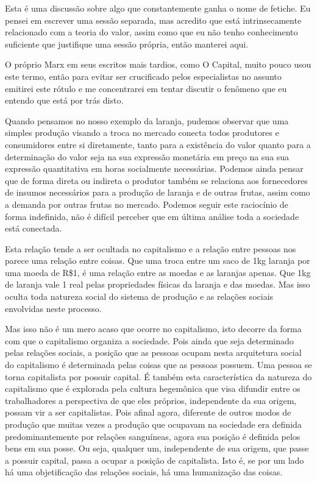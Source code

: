 Esta é uma discussão sobre algo que constantemente ganha o nome de fetiche. Eu pensei em escrever uma sessão separada, mas acredito que está intrinsecamente relacionado com a teoria do valor, assim como que eu não tenho conhecimento suficiente que justifique uma sessão própria, então manterei aqui.

O próprio Marx em seus escritos mais tardios, como O Capital, muito pouco usou este termo, então para evitar ser crucificado pelos especialistas no assunto emitirei este rótulo e me concentrarei em tentar discutir o fenômeno que eu entendo que está por trás disto. 

Quando pensamos no nosso exemplo da laranja, pudemos observar que uma simples produção visando a troca no mercado conecta todos produtores e consumidores entre si diretamente, tanto para a existência do valor quanto para a determinação do valor seja na sua expressão monetária em preço na sua sua expressão quantitativa em horas socialmente necessárias. Podemos ainda pensar que de forma direta ou indireta o produtor também se relaciona aos fornecedores de insumos necessários para a produção de laranja e de outras frutas, assim como a demanda por outras frutas no mercado. Podemos seguir este raciocínio de forma indefinida, não é difícil perceber que em última análise toda a sociedade está conectada.

Esta relação tende a ser ocultada no capitalismo e a relação entre pessoas nos parece uma relação entre coisas. Que uma troca entre um saco de 1kg laranja por uma moeda de R\$1, é uma relação entre as moedas e as laranjas apenas. Que 1kg de laranja vale 1 real pelas propriedades físicas da laranja e das moedas. Mas isso oculta toda natureza social do sistema de produção e as relações sociais envolvidas neste processo.

Mas isso não é um mero acaso que ocorre no capitalismo, isto decorre da forma com que o capitalismo organiza a sociedade. Pois ainda que seja determinado pelas relações sociais, a posição que as pessoas ocupam nesta arquitetura social do capitalismo é determinada pelas coisas que as pessoas possuem. Uma pessoa se torna capitalista por possuir capital. É também esta característica da natureza do capitalismo que é explorada pela cultura hegemônica que visa difundir entre os trabalhadores a perspectiva de que eles próprios, independente da sua origem, possam vir a ser capitalistas. Pois afinal agora, diferente de outros modos de produção que muitas vezes a produção que ocupavam na sociedade era definida predominantemente por relações sanguíneas, agora sua posição é definida pelos bens em sua posse. Ou seja, qualquer um, independente de sua origem, que passe a possuir capital, passa a ocupar a posição de capitalista.  Isto é, se por um lado há uma objetificação das relações sociais, há uma humanização das coisas.

